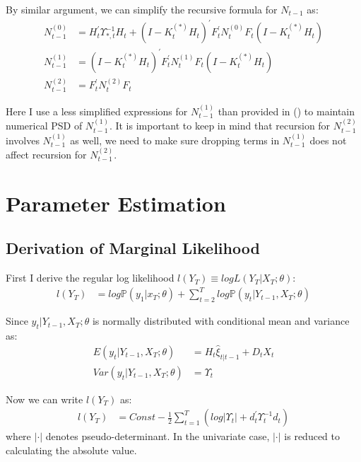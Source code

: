 \documentclass[10pt, titlepage]{article}
\numberwithin{equation}{section}
\begin{document}
By similar argument, we can simplify the recursive formula for $N_{t-1}$ as: 
\begin{align}
    N_{t-1}^{(0)} &= H_t^{'}\Upsilon_{*,t}^{-1}H_t+(I-K_t^{(*)}H_t)^{'}F_t^{'}N_t^{(0)}F_t(I-K_t^{(*)}H_t) \label{eq:N_0_start} \\
    N_{t-1}^{(1)} &= (I-K_t^{(*)}H_t)^{'}F_t^{'}N_t^{(1)}F_t(I-K_t^{(*)}H_t) \\
    N_{t-1}^{(2)} &= F_t^{'}N_t^{(2)}F_t \label{eq:N_0_end}
\end{align}

Here I use a less simplified expressions for $N_{t-1}^{(1)}$ than provided in (\cite{durbin_koopman_2003}) to maintain numerical PSD of $N_{t-1}^{(1)}$. It is important to keep in mind that recursion for $N_{t-1}^{(2)}$ involves $N_{t-1}^{(1)}$ as well, we need to make sure dropping terms in $N_{t-1}^{(1)}$ does not affect recursion for $N_{t-1}^{(2)}$. 

\section{Parameter Estimation}
\subsection{Derivation of Marginal Likelihood} \label{ap:NL}
First I derive the regular log likelihood $l(Y_T)\equiv logL(Y_T|X_T;\theta)$: 
\begin{align*}
    l(Y_T) &= log\mathbb{P}(y_1|x_T;\theta) + \sum_{t=2}^Tlog\mathbb{P}(y_t|Y_{t-1},X_T;\theta)
\end{align*}

Since $y_t|Y_{t-1},X_T;\theta$ is normally distributed with conditional mean and variance as:
\begin{align*}
    E(y_t|Y_{t-1},X_T;\theta) &= H_t\hat{\xi}_{t|t-1} + D_tX_t \\
    Var(y_t|Y_{t-1},X_T;\theta) &= \Upsilon_t
\end{align*}

Now we can write $l(Y_T)$ as:
\begin{align*}
    l(Y_T) &= Const - \frac{1}{2}\sum_{t=1}^T(log|\Upsilon_t| + d_t^{'}\Upsilon_t^{-1}d_t)
\end{align*}
where $|\cdot|$ denotes pseudo-determinant. In the univariate case, $|\cdot|$ is reduced to calculating the absolute value.
\end{document}
